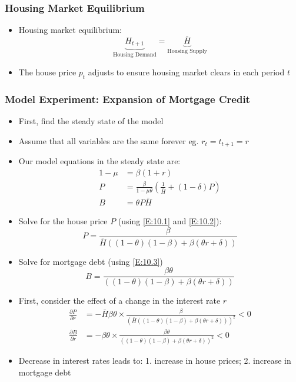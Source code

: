 \documentclass[a4paper,twoside]{article}
\newif\IfInSansMode
\numberwithin{equation}{section}
\numberwithin{figure}{section}
\begin{document}
\subsubsection{Housing Market Equilibrium}
	\begin{itemize}
		\item Housing market equilibrium:
		\[
			\underbrace{H_{t+1}}_\text{Housing Demand} = \underbrace{\bar{H}}_\text{Housing Supply}
		\]
		\item The house price \( p_t \) adjusts to ensure housing market clears in each period \( t \)
	\end{itemize}
\subsubsection{Model Experiment: Expansion of Mortgage Credit}
	\begin{itemize}
		\item First, find the \textcolor{myblue}{steady state} of the model
		\item Assume that all variables are the same forever eg. \( r_t=t_{t+1}=r \)
		\item Our model equations in the steady state are:
		\begin{align}
			1-\mu &= \beta(1+r) \label{E:10.1}\\
			P &= \frac{\beta}{1-\mu\theta} \left( \frac{1}{\bar{H}} + (1-\delta)P \right) \label{E:10.2}\\
			B &= \theta P\bar{H} \label{E:10.3}
		\end{align}
		\item Solve for the house price \( P \) (using \cref{E:10.1} and \cref{E:10.2}):
		\[
			P = \frac{\beta}{\bar{H}((1-\theta)(1-\beta)+\beta(\theta r+\delta))}
		\]
		\item Solve for mortgage debt (using \cref{E:10.3})
		\[
			B = \frac{\beta\theta}{((1-\theta)(1-\beta)+\beta(\theta r+\delta))}
		\]
		\item First, consider the effect of a \textcolor{myblue}{change in the interest rate \( \mathit{r} \)}
		\begin{align*}
			\frac{\partial P}{\partial r} &= -\bar{H}\beta\theta \times \frac{\beta}{(\bar{H}((1-\theta)(1-\beta)+\beta(\theta r+\delta)))^2} <0\\
			\frac{\partial B}{\partial r} &= -\beta\theta \times \frac{\beta\theta}{((1-\theta)(1-\beta)+\beta(\theta r+\delta))^2} <0
		\end{align*}
		\item Decrease in interest rates leads to: 1. \textcolor{myblue}{increase in house prices}; 2. \textcolor{myblue}{increase in mortgage debt}

\end{itemize}
\end{document}
